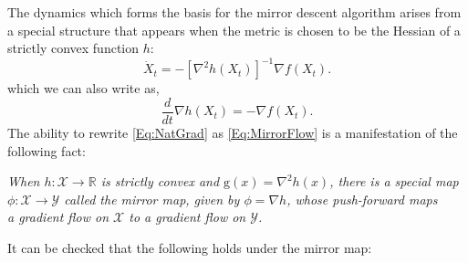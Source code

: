 \documentclass[11pt]{article}
\theoremstyle{plain}
\newcommand{\R}{{\mathbb R}}
\newcommand{\X}{{\mathcal X}}
\begin{document}
The dynamics which forms the basis for the mirror descent algorithm arises from a special structure that appears when the metric is chosen to be the Hessian of a strictly convex function $h$:
\begin{equation}\label{Eq:NatGrad}
\dot X_t = -[\nabla^2 h(X_t)]^{-1} \nabla f(X_t).
\end{equation}
which we can also write as,
\begin{equation}\label{Eq:MirrorFlow}
\frac{d}{dt} \nabla h(X_t) = - \nabla f(X_t).
\end{equation}
The ability to rewrite \eqref{Eq:NatGrad} as \eqref{Eq:MirrorFlow} is a manifestation of the following fact: \begin{center}{\em When $h:\X \rightarrow \R$ is strictly convex and $\mathrm{g}(x)= \nabla^2 h(x)$, there is a special map \\$\phi:\X \rightarrow \mathcal{Y}$ called the {\em mirror map}, given by $\phi = \nabla h$, whose push-forward maps\\ a gradient flow on $\X$ to a gradient flow on $\mathcal{Y}$. \cite{Acceleration}}\end{center} It can be checked that the following holds under the mirror map:
\end{document}
